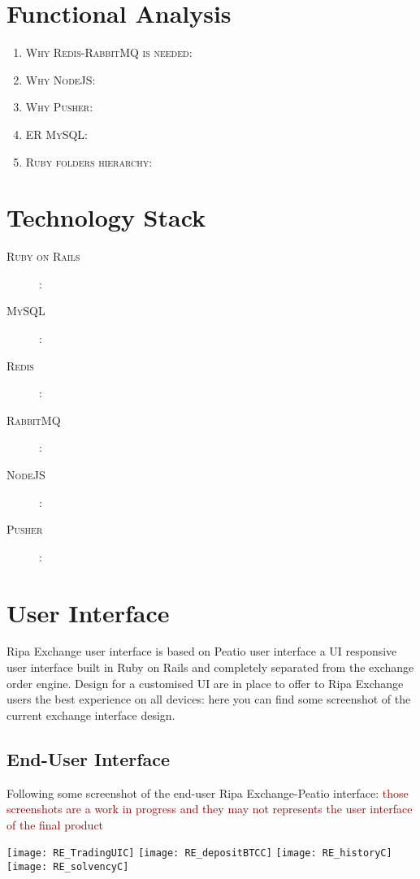 \documentclass[11pt,fleqn,oneside]{book} %
\begin{document}
\section{Functional Analysis}
\begin{enumerate}
	\item \textsc{Why Redis-RabbitMQ is needed}:
	\item \textsc{Why NodeJS}: 
	\item \textsc{Why Pusher}:
	\item \textsc{ER MySQL}:
	\item \textsc{Ruby folders hierarchy}:
\end{enumerate}

\section{Technology Stack}
\begin{description}
	\item[\textsc{Ruby on Rails}]:
	\item[\textsc{MySQL}]: 
	\item[\textsc{Redis}]:
	\item[\textsc{RabbitMQ}]:
	\item[\textsc{NodeJS}]:
	\item[\textsc{Pusher}]:
\end{description}

\section{User Interface}
Ripa Exchange user interface is based on Peatio user interface a UI responsive user interface built in Ruby on Rails and 
completely separated from the exchange order engine.
Design for a customised UI are in place to offer to Ripa Exchange users the best experience on all devices: here you can find
some screenshot of the current exchange interface design.

\subsection{End-User Interface}
Following some screenshot of the end-user Ripa Exchange-Peatio interface: 
\textcolor{darkred}{those screenshots are a work in progress and they may not represents the user interface of the final product}\\
\begin{center}
	\texttt{[image: RE\_TradingUIC]}
	\texttt{[image: RE\_depositBTCC]}
	\texttt{[image: RE\_historyC]}
	\texttt{[image: RE\_solvencyC]}
\end{center}
\end{document}
